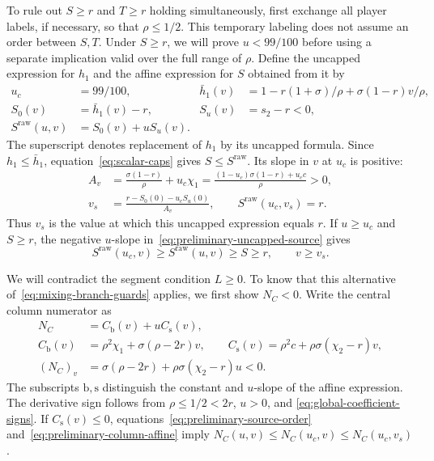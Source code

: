 \documentclass[11pt]{article}
\theoremstyle{remark}
\theoremstyle{plain}
\begin{document}
To rule out $S\ge r$ and $T\ge r$ holding simultaneously, first exchange all player
labels, if necessary, so that $\rho\le1/2$. This temporary labeling
does not assume an order between $S,T$. Under $S\ge r$, we will
prove $u<99/100$ before using a separate implication valid over
the full range of $\rho$. Define the uncapped expression for $h_1$
and the affine expression for $S$ obtained from it by
\begin{equation}
 \begin{aligned}
 u_c&=99/100,&
 \bar h_1(v)&=1-r(1+\sigma)/\rho+\sigma(1-r)v/\rho,\\
 S_0(v)&=\bar h_1(v)-r,& S_u(v)&=s_2-r<0,\\
 S^{\mathrm{raw}}(u,v)&=S_0(v)+uS_u(v).
 \end{aligned}
 \label{eq:preliminary-uncapped-source}
\end{equation}
The superscript denotes replacement of $h_1$ by its uncapped
formula. Since $h_1\le\bar h_1$, equation~\eqref{eq:scalar-caps}
gives $S\le S^{\mathrm{raw}}$. Its slope in $v$ at $u_c$ is positive:
\begin{equation}
 \begin{aligned}
 A_v&=\frac{\sigma(1-r)}{\rho}+u_c\chi_1
     =\frac{(1-u_c)\sigma(1-r)+u_cc}{\rho}>0,\\
 v_s&=\frac{r-S_0(0)-u_cS_u(0)}{A_v},\qquad
 S^{\mathrm{raw}}(u_c,v_s)=r.
 \end{aligned}
 \label{eq:preliminary-source-boundary}
\end{equation}
Thus $v_s$ is the value at which this uncapped expression equals
$r$. If $u\ge u_c$ and $S\ge r$, the negative $u$-slope
in~\eqref{eq:preliminary-uncapped-source} gives
\begin{equation}
 S^{\mathrm{raw}}(u_c,v)\ge S^{\mathrm{raw}}(u,v)\ge S\ge r,
 \qquad v\ge v_s.
 \label{eq:preliminary-source-order}
\end{equation}

We will contradict the segment condition $L\ge0$. To know that this
alternative of~\eqref{eq:mixing-branch-guards} applies, we first
show $N_C<0$. Write the central column numerator as
\begin{equation}
 \begin{aligned}
 N_C&=C_{\mathrm b}(v)+uC_{\mathrm s}(v),\\
 C_{\mathrm b}(v)&=\rho^2\chi_1+\sigma(\rho-2r)v,\qquad
 C_{\mathrm s}(v)=\rho^2c+\rho\sigma(\chi_2-r)v,\\
 (N_C)_v&=\sigma(\rho-2r)+\rho\sigma(\chi_2-r)u<0.
 \end{aligned}
 \label{eq:preliminary-column-affine}
\end{equation}
The subscripts $\mathrm b,\mathrm s$ distinguish the constant and
$u$-slope of the affine expression. The derivative sign follows
from $\rho\le1/2<2r$, $u>0$, and
\eqref{eq:global-coefficient-signs}. If $C_{\mathrm s}(v)\le0$,
equations~\eqref{eq:preliminary-source-order}
and~\eqref{eq:preliminary-column-affine} imply
$N_C(u,v)\le N_C(u_c,v)\le N_C(u_c,v_s)$.
\end{document}
